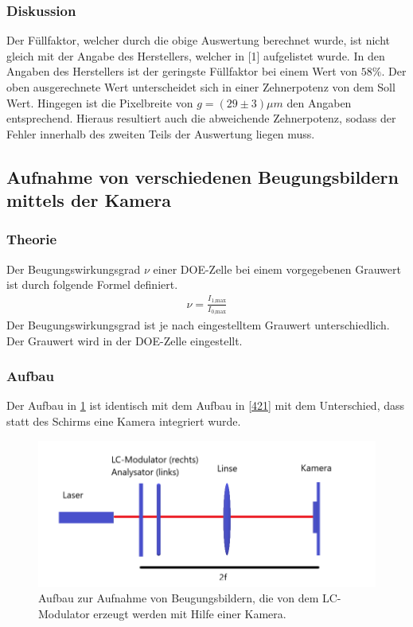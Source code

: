 \subsubsection{Diskussion}
Der Füllfaktor, welcher durch die obige Auswertung berechnet wurde, ist nicht gleich mit der Angabe des Herstellers, welcher in [1] aufgelistet wurde. In den Angaben des Herstellers ist der geringste Füllfaktor bei einem Wert von $58 \%$. Der oben ausgerechnete Wert unterscheidet sich in einer Zehnerpotenz von dem Soll Wert. Hingegen ist die Pixelbreite von $g = (29 \pm 3) \mu m$ den Angaben entsprechend. Hieraus resultiert auch die abweichende Zehnerpotenz, sodass der Fehler innerhalb des zweiten Teils der Auswertung liegen muss.

\subsection{Aufnahme von verschiedenen Beugungsbildern mittels der Kamera}
\subsubsection{Theorie}
Der Beugungswirkungsgrad $\nu$ einer DOE-Zelle bei einem vorgegebenen Grauwert ist durch folgende Formel definiert.
\begin{align}
	\nu = \frac{I_\text{1,max}}{I_\text{0,max}}
	\label{fff}
\end{align}
Der Beugungswirkungsgrad ist je nach eingestelltem Grauwert unterschiedlich. Der Grauwert wird in der DOE-Zelle eingestellt.
\subsubsection{Aufbau}
Der Aufbau in \cref{423} ist identisch mit dem Aufbau in \cref{421} mit dem Unterschied, dass statt des Schirms eine Kamera integriert wurde.
\begin{figure}[h!]
	\centering
	\includegraphics[scale = 1]{Kamera111.png}
	\caption{Aufbau zur Aufnahme von Beugungsbildern, die von dem LC-Modulator erzeugt werden mit Hilfe einer Kamera.}
	\label{423}
\end{figure}
